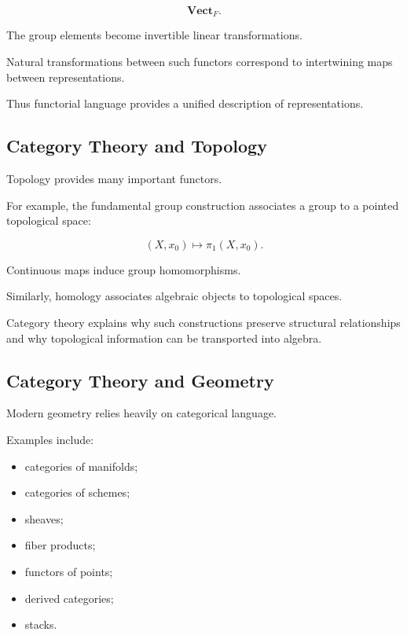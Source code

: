 \[ \mathbf{Vect}_F. \]

The group elements become invertible linear transformations.

Natural transformations between such functors correspond to intertwining
maps between representations.

Thus functorial language provides a unified description of representations.

\subsection{Category Theory and Topology}
\label{subsec:category-topology-connection}

Topology provides many important functors.

For example, the fundamental group construction associates a group to a
pointed topological space:

\[ (X,x_0)\mapsto\pi_1(X,x_0). \]

Continuous maps induce group homomorphisms.

Similarly, homology associates algebraic objects to topological spaces.

Category theory explains why such constructions preserve structural
relationships and why topological information can be transported into
algebra.

\subsection{Category Theory and Geometry}
\label{subsec:category-geometry}

Modern geometry relies heavily on categorical language.

Examples include:

\begin{itemize}
    \item categories of manifolds;
    \item categories of schemes;
    \item sheaves;
    \item fiber products;
    \item functors of points;
    \item derived categories;
    \item stacks.
\end{itemize}

